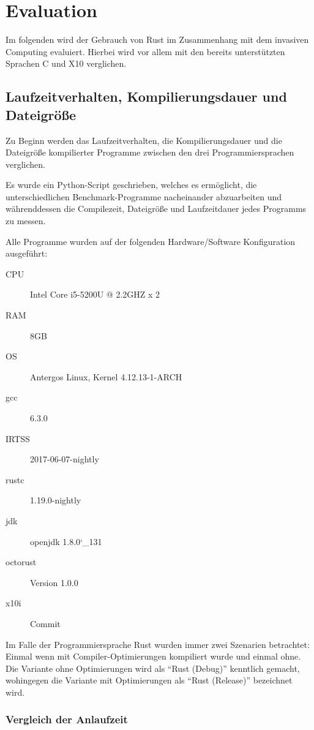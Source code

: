 \chapter{Evaluation}\label{sec:eval}

Im folgenden wird der Gebrauch von Rust im Zusammenhang mit dem invasiven Computing evaluiert. Hierbei
wird vor allem mit den bereits unterstützten Sprachen C und X10 verglichen.

\section{Laufzeitverhalten, Kompilierungsdauer und Dateigröße}

Zu Beginn werden das Laufzeitverhalten, die Kompilierungsdauer und die Dateigröße kompilierter Programme zwischen
den drei Programmiersprachen verglichen.

Es wurde ein Python-Script geschrieben, welches es ermöglicht, die unterschiedlichen Benchmark-Programme nacheinander
abzuarbeiten und währenddessen die Compilezeit, Dateigröße und Laufzeitdauer jedes Programms zu messen.

Alle Programme wurden auf der folgenden Hardware/Software Konfiguration ausgeführt:

\begin{description}
	\item[CPU] Intel Core i5-5200U @ 2.2GHZ x 2
	\item[RAM] 8GB
	\item[OS] Antergos Linux, Kernel 4.12.13-1-ARCH
	\item[gcc] 6.3.0
	\item[IRTSS] 2017-06-07-nightly
	\item[rustc] 1.19.0-nightly
	\item[jdk] openjdk 1.8.0\char`_131
	\item[octorust] Version 1.0.0
	\item[x10i] Commit
\end{description}

Im Falle der Programmiersprache Rust wurden immer zwei Szenarien betrachtet: Einmal wenn mit Compiler-Optimierungen
kompiliert wurde und einmal ohne. Die Variante ohne Optimierungen wird als ``Rust (Debug)'' kenntlich gemacht,
wohingegen die Variante mit Optimierungen als ``Rust (Release)'' bezeichnet wird.

\subsection{Vergleich der Anlaufzeit}

